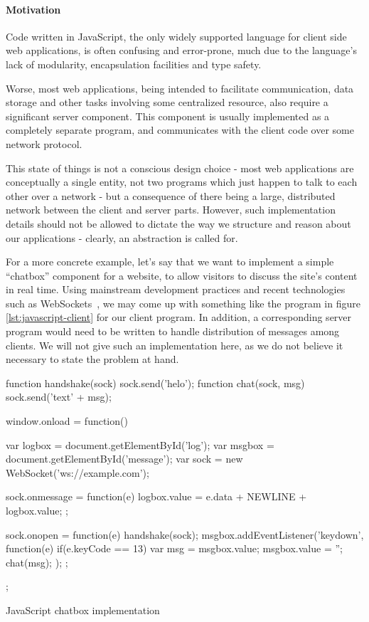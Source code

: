 \documentclass[preprint]{sigplanconf}
\begin{document}
\paragraph{Motivation}

Code written in JavaScript, the only widely supported language for client side
web applications, is often confusing and error-prone, much due to the
language's lack of modularity, encapsulation facilities and type safety.

Worse, most web applications, being intended to facilitate communication, data
storage and other tasks involving some centralized resource, also require a
significant server component. This component is usually implemented as a
completely separate program, and communicates with the client code over some
network protocol.

This state of things is not a conscious design choice - most web applications
are conceptually a single entity, not two programs which just happen to talk
to each other over a network - but a consequence of there being a large,
distributed network between the client and server parts.
However, such implementation details should not be allowed to dictate the way
we structure and reason about our applications - clearly, an abstraction is
called for.

For a more concrete example, let's say that we want to implement a simple
``chatbox'' component for a website, to allow visitors to discuss the site's
content in real time. Using mainstream development practices and recent
technologies such as WebSockets\ \cite{websockets}, we may come up with
something like the program in figure \ref{lst:javascript-client} for our
client program. In addition, a corresponding server program would need to be
written to handle distribution of messages among clients. We will not give such
an implementation here, as we do not believe it necessary to state the problem
at hand.

\label{sec:jsexample}
\begin{listingfloat}
\begin{code}
function handshake(sock) {sock.send('helo');}
function chat(sock, msg) {sock.send('text' + msg);}

window.onload = function() {
  var logbox = document.getElementById('log');
  var msgbox = document.getElementById('message');
  var sock = new WebSocket('ws://example.com');

  sock.onmessage = function(e) {
    logbox.value = e.data + NEWLINE + logbox.value;
  };

  sock.onopen = function(e) {
    handshake(sock);
    msgbox.addEventListener('keydown', function(e) {
      if(e.keyCode == 13) {
        var msg = msgbox.value;
        msgbox.value = '';
        chat(msg);
      }
    });
  };
};
\end{code}
\caption{JavaScript chatbox implementation}
\label{lst:javascript-client}
\end{listingfloat}
\end{document}
